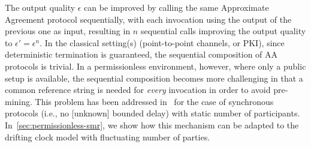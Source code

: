 The output quality $\epsilon$ can be improved by calling the same Approximate Agreement protocol sequentially, with each invocation using the output of the previous one as input, resulting in $n$ sequential calls improving the output quality to $\epsilon' = \epsilon^n$.
%
In the classical setting(s) (point-to-point channels, or PKI), since deterministic termination is guaranteed, the sequential composition of AA protocols is trivial.
%
In a permissionless environment, however, where only a public setup is available, the sequential composition becomes more challenging in that a common reference string is needed for \emph{every} invocation in order to avoid pre-mining.
%
This problem has been addressed in~\cite{EC:GarKiaShe24} for the case of synchronous protocols (i.e., no [unknown] bounded delay) with static number of participants.
%
In~\cref{sec:permissionless-smr}, we show how this mechanism can be adapted to the drifting clock model with fluctuating number of parties.
